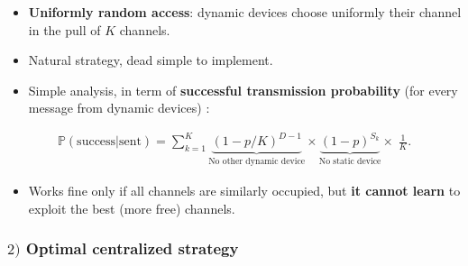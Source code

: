 \begin{frameO}

    \begin{itemize}
        \item
              \textbf{Uniformly random access}: dynamic devices choose uniformly
              their channel in the pull of \(K\) channels.
        \item
              Natural strategy, dead simple to implement.
    \end{itemize}

    \pause

    \begin{itemize}
        \item
              Simple analysis, in term of \textbf{successful transmission
                  probability} (for every message from dynamic devices) :
    \end{itemize}

    \begin{small} \begin{align*}
            \mathbb{P}(\text{success}|\text{sent}) = \sum_{k=1}^{K} \underbrace{(1 - p / K)^{D-1}}_{\text{No other dynamic device}} \times \underbrace{(1-p)^{S_k}}_{\text{No static device}} \times\; \frac{1}{K}.
        \end{align*} \end{small}

    \pause

    \begin{itemize}
        \item
              Works fine only if all channels are similarly occupied,\newline
              but \textbf{it cannot learn} to exploit the best (more free)
              channels.
    \end{itemize}

\end{frameO}



\subsubsection{$2)$ Optimal centralized strategy}

